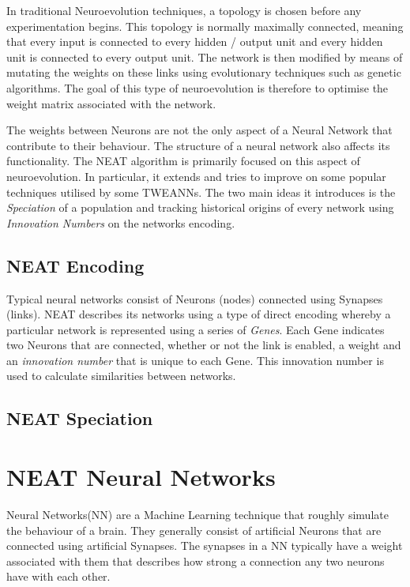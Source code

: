\documentclass[]{Learning-to-Play-Wolfenstein-thesis}
\begin{document}
In traditional Neuroevolution techniques, a topology is chosen before any experimentation begins. This topology is normally maximally connected, meaning that every input is connected to every hidden / output unit and every hidden unit is connected to every output unit. The network is then modified by means of mutating the weights on these links using evolutionary techniques such as genetic algorithms. The goal of this type of neuroevolution is therefore to optimise the weight matrix associated with the network.

The weights between Neurons are not the only aspect of a Neural Network that contribute to their behaviour. The structure of a neural network also affects its functionality. The NEAT algorithm is primarily focused on this aspect of neuroevolution. In particular, it extends and tries to improve on some popular techniques utilised by some TWEANNs. The two main ideas it introduces is the \textit{Speciation} of a population and tracking historical origins of every network using \textit{Innovation Numbers} on the networks encoding.

\subsection{NEAT Encoding}
Typical neural networks consist of Neurons (nodes) connected using Synapses (links). NEAT describes its networks using a type of direct encoding whereby a particular network is represented using a series of \textit{Genes}. Each Gene indicates two Neurons that are connected, whether or not the link is enabled, a weight and an \textit{innovation number} that is unique to each Gene. This innovation number is used to calculate similarities between networks. 

\subsection{NEAT Speciation}


\section{NEAT Neural Networks}
Neural Networks(NN) are a Machine Learning technique that roughly simulate the behaviour of a brain. They generally consist of artificial Neurons that are connected using artificial Synapses. The synapses in a NN typically have a weight associated with them that describes how strong a connection any two neurons have with each other.
\end{document}

